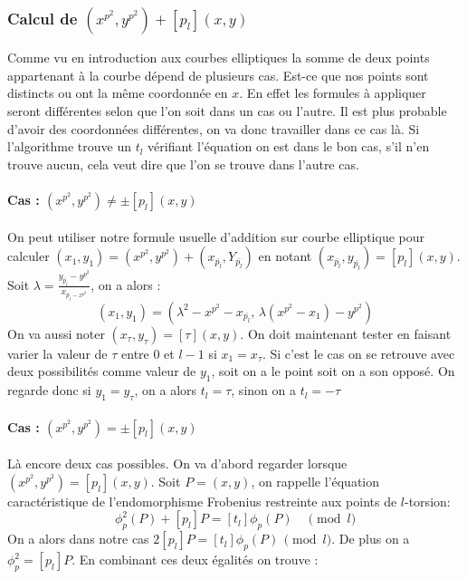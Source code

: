 \documentclass{article}
\begin{document}
\subsubsection{Calcul de $(x^{p^2}, y^{p^2}) + [p_l](x,y)$}

Comme vu en introduction aux courbes elliptiques la somme de deux points appartenant à la courbe dépend de plusieurs cas. Est-ce que nos points sont distincts ou ont la même coordonnée en $x$. En effet les formules à appliquer seront différentes selon que l'on soit dans un cas ou l'autre. Il est plus probable d'avoir des coordonnées différentes, on va donc travailler dans ce cas là. Si l'algorithme trouve un $t_l$ vérifiant l'équation on est dans le bon cas, s'il n'en trouve aucun, cela veut dire que l'on se trouve dans l'autre cas.
\paragraph*{Cas : $(x^{p^2}, y^{p^2}) \ne \pm [p_l](x,y)$}

On peut utiliser notre formule usuelle d'addition sur courbe elliptique pour calculer $(x_1, y_1) = (x^{p^2}, y^{p^2}) + (x_{\bar{p_l}}, Y_{\bar{p_l}})$ en notant $(x_{\bar{p_l}}, y_{\bar{p_l}}) =  [p_l](x,y)$. 
\newline
Soit $\lambda = \frac{y_{\bar{p_l}} - y^{p^2}}{x_{\bar{p_l} - x^{p^2}}}$, on a alors :
\begin{equation}
(x_1, y_1) = (\lambda^2 - x^{p^2} - x_{\bar{p_l}}, \, \lambda (x^{p^2} - x_1) -  y^{p^2})
\end{equation}
On va aussi noter $(x_{\tau}, y_{\tau}) =  [\tau](x,y)$. On doit maintenant tester en faisant varier la valeur de $\tau$ entre $0$ et $l -1$ si $x_1 = x_{\tau}$. Si c'est le cas on se retrouve avec deux possibilités comme valeur de $y_1$, soit on a le point soit on a son opposé. On regarde donc si $y_1 = y_{\tau}$, on a alors $t_l = \tau$, sinon on a $t_l = - \tau$

\paragraph*{Cas : $(x^{p^2}, y^{p^2}) = \pm [p_l](x,y)$}
Là encore deux cas possibles. On va d'abord regarder lorsque $(x^{p^2}, y^{p^2}) = [p_l](x,y)$. 
\newline
Soit $P=(x,y)$, on rappelle l’équation caractéristique de l'endomorphisme Frobenius restreinte aux points de $l$-torsion: 
\begin{equation}
\phi_p^2(P)  + [p_l]P = [t_{l}] \phi_p(P) \quad \pmod{l}
\end{equation}
On a alors dans notre cas $2[p_l]P = [t_{l}] \phi_p(P) \, \pmod{l}$. De plus on a $\phi_p^2 = [p_l]P$. En combinant ces deux égalités on trouve :
\end{document}
